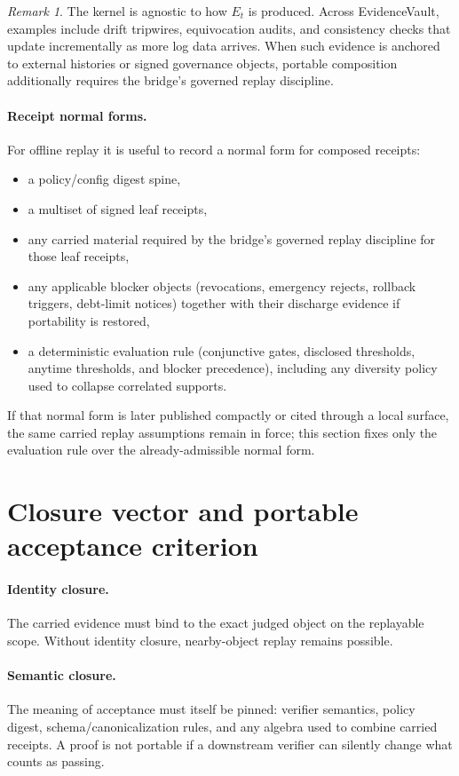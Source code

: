 \documentclass[11pt]{article}
\theoremstyle{remark}
\newtheorem{remark}{Remark}
\begin{document}
\begin{remark}
The kernel is agnostic to how $E_t$ is produced.
Across EvidenceVault, examples include drift tripwires, equivocation audits, and consistency checks that update incrementally as more log data arrives.
When such evidence is anchored to external histories or signed governance objects, portable composition additionally requires the bridge's governed replay discipline.
\end{remark}

\paragraph{Receipt normal forms.}
For offline replay it is useful to record a normal form for composed receipts:
\begin{itemize}[leftmargin=*]
\item a policy/config digest spine,
\item a multiset of signed leaf receipts,
\item any carried material required by the bridge's governed replay discipline for those leaf receipts,
\item any applicable blocker objects (revocations, emergency rejects, rollback triggers, debt-limit notices) together with their discharge evidence if portability is restored,
\item a deterministic evaluation rule (conjunctive gates, disclosed thresholds, anytime thresholds, and blocker precedence), including any diversity policy used to collapse correlated supports.
\end{itemize}
If that normal form is later published compactly or cited through a local surface, the same carried replay assumptions remain in force;
this section fixes only the evaluation rule over the already-admissible normal form.

\section{Closure vector and portable acceptance criterion}

\paragraph{Identity closure.}
The carried evidence must bind to the exact judged object on the replayable scope.
Without identity closure, nearby-object replay remains possible.

\paragraph{Semantic closure.}
The meaning of acceptance must itself be pinned: verifier semantics, policy digest, schema/canonicalization rules,
and any algebra used to combine carried receipts. A proof is not portable if a downstream verifier can silently change what counts as passing.
\end{document}
